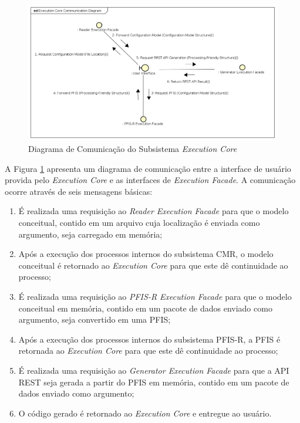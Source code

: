 \begin{figure}[htb]
    \begin{center}
        \includegraphics[scale=0.57]{imagens/Execution_Core_Communication_Diagram.png}
    \end{center}
	\caption{\label{fig_eccom}Diagrama de Comunicação do Subsistema \textit{Execution Core}}
\end{figure}

A Figura \ref{fig_eccom} apresenta um diagrama de comunicação entre a interface de usuário provida pelo \textit{Execution Core} e as interfaces de \textit{Execution Facade}. A comunicação ocorre através de seis mensagens básicas:

\begin{enumerate}
    \item É realizada uma requisição ao \textit{Reader Execution Facade} para que o modelo conceitual, contido em um arquivo cuja localização é enviada como argumento, seja carregado em memória;
    \item Após a execução dos processos internos do subsistema CMR, o modelo conceitual é retornado ao \textit{Execution Core} para que este dê continuidade ao processo;
    \item É realizada uma requisição ao \textit{PFIS-R Execution Facade} para que o modelo conceitual em memória, contido em um pacote de dados enviado como argumento, seja convertido em uma PFIS;
    \item Após a execução dos processos internos do subsistema PFIS-R, a PFIS é retornada ao \textit{Execution Core} para que este dê continuidade ao processo;
    \item É realizada uma requisição ao \textit{Generator Execution Facade} para que a API REST seja gerada a partir do PFIS em memória, contido em um pacote de dados enviado como argumento;
    \item O código gerado é retornado ao \textit{Execution Core} e entregue ao usuário.
\end{enumerate}

